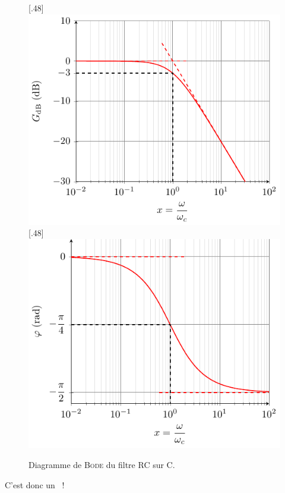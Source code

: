 \documentclass[../../main/main.tex]{subfiles}
\begin{document}
\begin{figure}[htbp!]
	\centering
	[.48\linewidth]
	{\includegraphics[width=\linewidth]{RCC_bode-gain}}
	[.48\linewidth]
	{\includegraphics[width=\linewidth]{RCC_bode-phase}}
	\caption{Diagramme de \textsc{Bode} du filtre RC sur C.}
	\label{fig:rccbode_first}
\end{figure}

C'est donc un ~!

\end{document}
